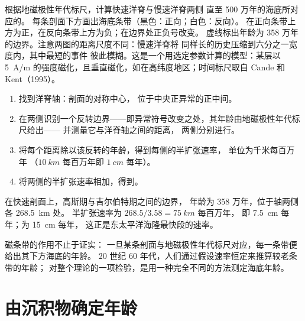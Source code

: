 \begin{omfigure}
{\small 根据地磁极性年代标尺，计算快速洋脊与慢速洋脊两侧
直至 500 万年的海底所对应的。
每条剖面下方画出海底条带（黑色：正向；白色：反向）。
在正向条带上方为正，在反向条带上方为负；在边界处正负号改变。
虚线标出年龄为
358 万年的边界。注意两图的距离尺度不同：慢速洋脊将
同样长的历史压缩到六分之一宽度内，其中最短的事件
彼此模糊。这是一个用选定参数计算的模型：某层以
\qty{5}{A/m} 的强度磁化，且垂直磁化，如在高纬度地区；时间标尺取自
Cande 和 Kent（1995）。}
\end{omfigure}

\begin{method}[由磁剖面求扩张速率]\label{met:g11:drift-to-spreading:rate}
\begin{enumerate}
  \item 找到洋脊轴：剖面的对称中心，
        位于中央正异常的正中间。
  \item 在两侧识别一个反转边界——即异常符号改变之处，其年龄由地磁极性年代标尺给出——
        并测量它与洋脊轴之间的距离，
        两侧分别进行。
  \item 将每个距离除以该反转的年龄，得到每侧的半扩张速率，
        单位为千米每百万年
        （$\qty{10}{km}$ 每百万年即 $\qty{1}{cm}$ 每年）。
  \item 将两侧的半扩张速率相加，得到。
\end{enumerate}
\end{method}

\begin{example}[快速洋脊]\label{ex:g11:drift-to-spreading:fast}
在快速剖面上，高斯期与吉尔伯特期之间的边界，
年龄为 358 万年，位于轴两侧各 \qty{268.5}{km} 处。
半扩张速率为 $268.5/3.58 = \qty{75}{km}$ 每百万年，
即 \qty{7.5}{cm} 每年；为 \qty{15}{cm} 每年，
这正是东太平洋海隆最快段的速率。
\end{example}

磁条带的作用不止于证实：
一旦某条剖面与地磁极性年代标尺对应，每一条带便给出其下方海底的年龄。
20 世纪 60 年代，人们通过假设速率恒定来推算较老条带的年龄；
对整个理论的一项检验，是用一种完全不同的方法测定海底年龄。

\section{由沉积物确定年龄}

